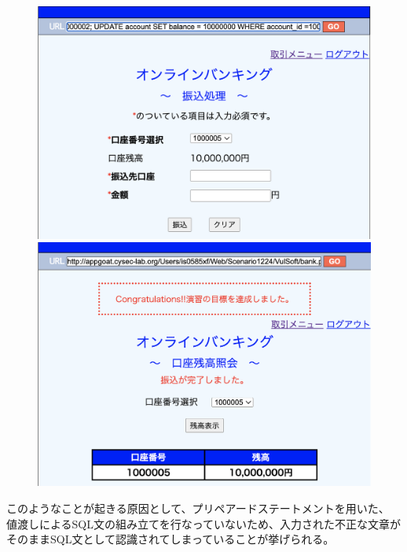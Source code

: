 \documentclass[dvipdfmx,autodetect-engine,titlepage]{jsarticle}
\begin{document}
\begin{figure}[h]
  \centering
  \begin{minipage}[b]{0.45\linewidth}
  \begin{center}
    \includegraphics[keepaspectratio,scale=0.35]{pic20.png}
    \end{center}
    \caption{}
  \end{minipage}
  \begin{minipage}[b]{0.45\linewidth}
  \begin{center}
    \includegraphics[keepaspectratio,scale=0.35]{pic21.png}
    \end{center}
    \caption{}
  \end{minipage}
\end{figure}

このようなことが起きる原因として、プリペアードステートメントを用いた、
値渡しによるSQL文の組み立てを行なっていないため、入力された不正な文章が
そのままSQL文として認識されてしまっていることが挙げられる。
\end{document}

